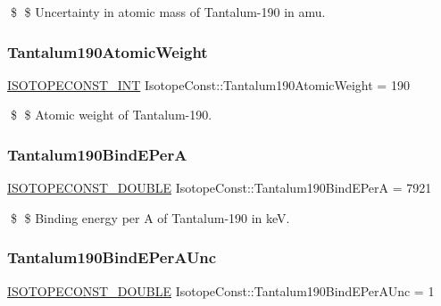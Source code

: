 \$ \$ Uncertainty in atomic mass of Tantalum-\/190 in amu. \mbox{\label{group___isotope_const-_tantalum-_ta190_gac3435d06329442c9519f5c7ea6eeeb91}} 
\subsubsection{\texorpdfstring{Tantalum190\+Atomic\+Weight}{Tantalum190AtomicWeight}}
{\footnotesize\ttfamily \mbox{\hyperlink{group___isotope_const-_macros_ga5f18360b3e99483a35c32d789e62621c}{I\+S\+O\+T\+O\+P\+E\+C\+O\+N\+S\+T\+\_\+\+I\+NT}} Isotope\+Const\+::\+Tantalum190\+Atomic\+Weight = 190}

\$ \$ Atomic weight of Tantalum-\/190. \mbox{\label{group___isotope_const-_tantalum-_ta190_ga36368b6358696ff79d9976edb0a39566}} 
\subsubsection{\texorpdfstring{Tantalum190\+Bind\+E\+PerA}{Tantalum190BindEPerA}}
{\footnotesize\ttfamily \mbox{\hyperlink{group___isotope_const-_macros_ga8f45a7272ce02c0b4c65c44636ed719a}{I\+S\+O\+T\+O\+P\+E\+C\+O\+N\+S\+T\+\_\+\+D\+O\+U\+B\+LE}} Isotope\+Const\+::\+Tantalum190\+Bind\+E\+PerA = 7921}

\$ \$ Binding energy per A of Tantalum-\/190 in keV. \mbox{\label{group___isotope_const-_tantalum-_ta190_ga65079825347e7fa552be182f2bbe32d9}} 
\subsubsection{\texorpdfstring{Tantalum190\+Bind\+E\+Per\+A\+Unc}{Tantalum190BindEPerAUnc}}
{\footnotesize\ttfamily \mbox{\hyperlink{group___isotope_const-_macros_ga8f45a7272ce02c0b4c65c44636ed719a}{I\+S\+O\+T\+O\+P\+E\+C\+O\+N\+S\+T\+\_\+\+D\+O\+U\+B\+LE}} Isotope\+Const\+::\+Tantalum190\+Bind\+E\+Per\+A\+Unc = 1}

